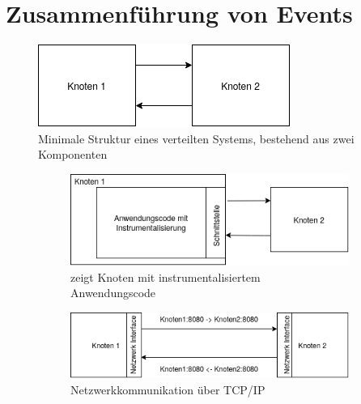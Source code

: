 \section{Zusammenführung von Events}
\label{section: Ordnungsproblem von Events}
\begin{figure}[!ht]
	\centering
	\includegraphics[scale=0.5]{img/Problembeschreibung/distributed_system_application_minimal.png}
	\caption[Minimale Struktur eines verteilten Systems]{Minimale Struktur eines verteilten Systems, bestehend aus zwei Komponenten}
	\label{fig:distributed_system_application_minimal}
\end{figure}
\begin{figure}[!ht]
	\centering
	\begin{subfigure}[t]{.49\linewidth}
		\centering\includegraphics[width=0.9\linewidth]{img/Problembeschreibung/distributed_system_application_inside.png}
		\caption[Abbildung]{zeigt Knoten mit instrumentalisiertem Anwendungscode}
		\label{fig:distributed_system_application_inside}
	\end{subfigure}
	\begin{subfigure}[t]{.49\linewidth}
		\centering\includegraphics[width=\linewidth]{img/Problembeschreibung/distributed_system_network.png}
		\caption[Abbildung]{Netzwerkkommunikation über TCP/IP}
		\label{fig:distributed_system_network}
	\end{subfigure}
	\caption[Anwendungsinstrumentalisierung und Netzwerkkommunikation über TCP/IP in verteilten Systemen]{}
\end{figure} 

